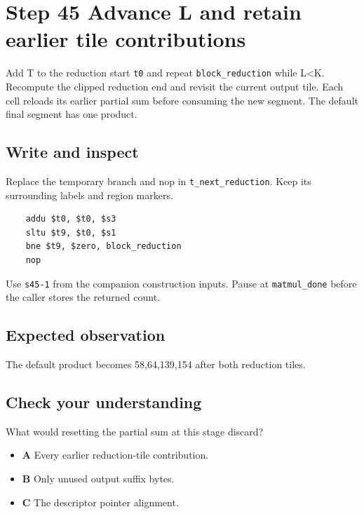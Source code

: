\section{Step 45 Advance L and retain earlier tile contributions}\label{matmul-s45}

Add T to the reduction start \texttt{t0} and repeat \texttt{block\_reduction} while L<K. Recompute the clipped reduction end and revisit the current output tile. Each cell reloads its earlier partial sum before consuming the new segment. The default final segment has one product.

\subsection{Write and inspect}
Replace the temporary branch and nop in \texttt{t\_next\_reduction}. Keep its surrounding labels and region markers.

\begin{verbatim}
    addu $t0, $t0, $s3
    sltu $t9, $t0, $s1
    bne $t9, $zero, block_reduction
    nop
\end{verbatim}
Use \texttt{s45-1} from the companion construction inputs. Pause at \texttt{matmul\_done} before the caller stores the returned count.

\subsection{Expected observation}
The default product becomes 58,64,139,154 after both reduction tiles.

\subsection{Check your understanding}
What would resetting the partial sum at this stage discard?

\begin{itemize}
\item \textbf{A} Every earlier reduction-tile contribution.
\item \textbf{B} Only unused output suffix bytes.
\item \textbf{C} The descriptor pointer alignment.
\end{itemize}
